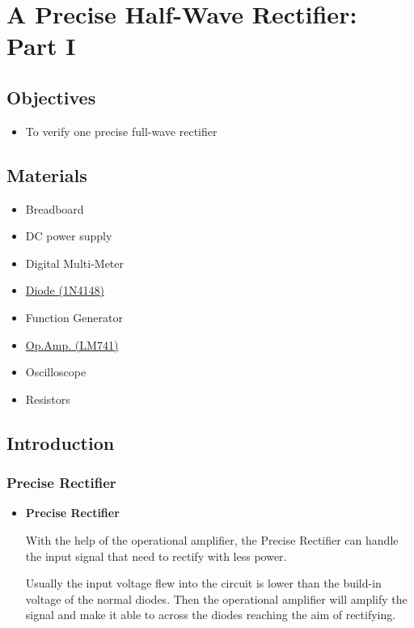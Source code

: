 \chapter{A Precise Half-Wave Rectifier: Part I}


\section{Objectives}
\begin{itemize}
    \item To verify one precise full-wave rectifier
\end{itemize}

\section{Materials}
\begin{itemize}
    \item Breadboard
    \item DC power supply
    \item Digital Multi-Meter
    \item \hyperref[1N4148]{Diode (1N4148)}
    \item Function Generator
    \item \hyperref[LM741_1]{Op.Amp. (LM741)}
    \item Oscilloscope
    \item Resistors
\end{itemize}

\section{Introduction}
    \subsection{Precise Rectifier}
        \begin{itemize}
            \item \textbf{Precise Rectifier}\par
                With the help of the operational amplifier, the Precise Rectifier can handle the input signal that need to rectify with less power.\par
                Usually the input voltage flew into the circuit is lower than the build-in voltage of the normal diodes. Then the operational amplifier will amplify the signal and make it able to across the diodes reaching the aim of rectifying.
        \end{itemize}
        
